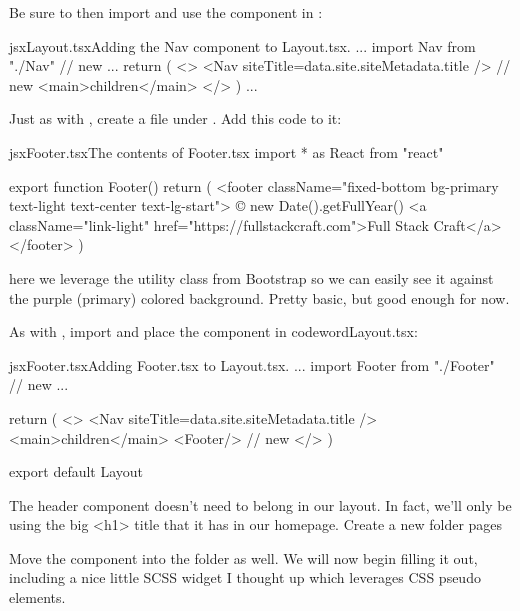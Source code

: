 \documentclass[a4paper,headinclude=on,footinclude=on,12pt,oneside]{scrbook}
\begin{document}
Be sure to then import and use the  component in :

\begin{codeInput}{jsx}{Layout.tsx}{Adding the Nav component to Layout.tsx.}
...
import { Nav } from "./Nav" // new
...
return (
  <>
    <Nav siteTitle={data.site.siteMetadata.title} /> // new
    <main>{children}</main>
  </>
)
...
\end{codeInput}


Just as with , create a  file under . Add this code to it:

\begin{codeInput}{jsx}{Footer.tsx}{The contents of Footer.tsx}
import * as React from "react"

export function Footer() {
  return (
    <footer className="fixed-bottom bg-primary text-light text-center text-lg-start">
      © {new Date().getFullYear()} <a className="link-light" href="https://fullstackcraft.com">Full Stack Craft</a>
    </footer>
  )
}
\end{codeInput}

here we leverage the  utility class from Bootstrap so we can easily see it against the purple (primary) colored background. Pretty basic, but good enough for now.

As with  , import and place the  component in codeword{Layout.tsx}:

\begin{codeInput}{jsx}{Footer.tsx}{Adding Footer.tsx to Layout.tsx.}
...
import { Footer } from "./Footer" // new
...

return (
  <>
    <Nav siteTitle={data.site.siteMetadata.title} />
    <main>{children}</main>
    <Footer/> // new
  </>
)

export default Layout  
\end{codeInput}


The header component doesn't need to belong in our layout. In fact, we'll only be using the big <h1> title that it has in our homepage. Create a new folder pages 

Move the  component into the  folder as well. We will now begin filling it out, including a nice little SCSS widget I thought up which leverages CSS pseudo elements.
\end{document}
